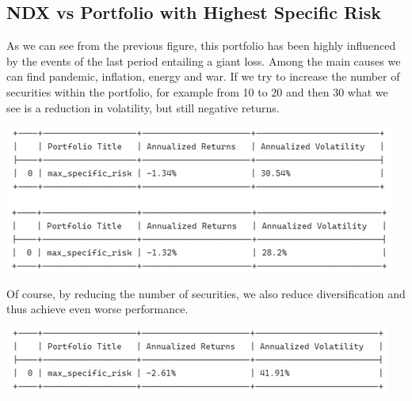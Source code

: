 \documentclass[twocolumn]{article}
\begin{document}
\subsection{NDX vs Portfolio with Highest Specific Risk}
As we can see from the previous figure, this portfolio has been highly influenced by the events of the last period entailing a giant loss. Among the main causes we can find pandemic, inflation, energy and war. If we try to increase the number of securities within the portfolio, for example from 10 to 20 and then 30 what we see is a reduction in volatility, but still negative returns.
\begin{center}
\includegraphics[scale=0.5]{asd1.png}
\end{center}
Of course, by reducing the number of securities, we also reduce diversification and thus achieve even worse performance.
\begin{center}
\includegraphics[scale=0.5]{asd2.png}
\end{center}
\end{document}
